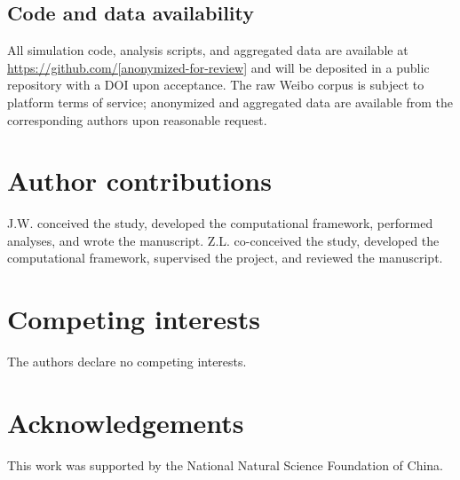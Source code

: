 \documentclass[12pt]{article}
\begin{document}
\subsection{Code and data availability}
All simulation code, analysis scripts, and aggregated data are available at \url{https://github.com/[anonymized-for-review]} and will be deposited in a public repository with a DOI upon acceptance. The raw Weibo corpus is subject to platform terms of service; anonymized and aggregated data are available from the corresponding authors upon reasonable request.

\FloatBarrier


\section*{Author contributions}
J.W. conceived the study, developed the computational framework, performed analyses, and wrote the manuscript.
Z.L. co-conceived the study, developed the computational framework, supervised the project, and reviewed the manuscript.

\section*{Competing interests}
The authors declare no competing interests.

\section*{Acknowledgements}
This work was supported by the National Natural Science Foundation of China.



\end{document}
